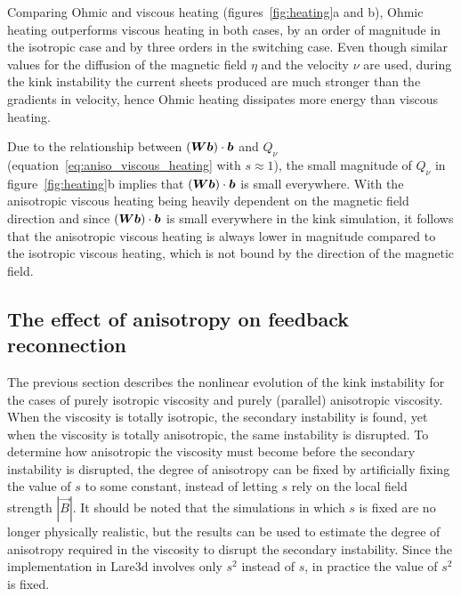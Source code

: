 Comparing Ohmic and viscous heating (figures~\ref{fig:heating}a and b), Ohmic heating outperforms viscous heating in both cases, by an order of magnitude in the isotropic case and by three orders in the switching case. Even though similar values for the diffusion of the magnetic field $\eta$ and the velocity $\nu$ are used, during the kink instability the current sheets produced are much stronger than the gradients in velocity, hence Ohmic heating dissipates more energy than viscous heating.

Due to the relationship between $({\bm W} {\bm b}) \cdot {\bm b}$ and $Q_{\nu}$ (equation~\eqref{eq:aniso_viscous_heating} with $s\approx 1$), the small magnitude of $Q_{\nu}$ in figure~\ref{fig:heating}b implies that $({\bm W} {\bm b}) \cdot {\bm b}$ is small everywhere. With the anisotropic viscous heating being heavily dependent on the magnetic field direction and since $({\bm W} {\bm b}) \cdot {\bm b}$ is small everywhere in the kink simulation, it follows that the anisotropic viscous heating is always lower in magnitude compared to the isotropic viscous heating, which is not bound by the direction of the magnetic field.

\subsection{The effect of anisotropy on feedback reconnection}

The previous section describes the nonlinear evolution of the kink instability for the cases of purely isotropic viscosity and purely (parallel) anisotropic viscosity. When the viscosity is totally isotropic, the secondary instability is found, yet when the viscosity is totally anisotropic, the same instability is disrupted. To determine how anisotropic the viscosity must become before the secondary instability is disrupted, the degree of anisotropy can be fixed by artificially fixing the value of $s$ to some constant, instead of letting $s$ rely on the local field strength $|\vec{B}|$. It should be noted that the simulations in which $s$ is fixed are no longer physically realistic, but the results can be used to estimate the degree of anisotropy required in the viscosity to disrupt the secondary instability. Since the implementation in Lare3d involves only $s^2$ instead of $s$, in practice the value of $s^2$ is fixed.

